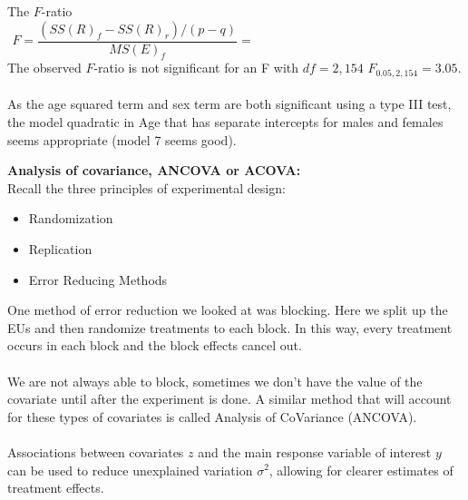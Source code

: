The $F$-ratio 
$$F=\frac{\left(SS(R)_f - SS(R)_r\right)/(p-q)}{MS(E)_f} = ~~~~~~~~~~~~~~~~~~~~~~~~~~~~~~~~~~~~~~~~~~~~~~~~~~~~~~~~~~~~~~~~~~~~~~~~~$$
The observed $F$-ratio is not significant for an F with $df=2,154$ $F_{0.05,2,154}=3.05$.\\~\\

As the age squared term and sex term are both significant using a type III test, the model quadratic in Age that has separate intercepts for males and females seems appropriate (model 7 seems good).

\newpage

\Large\textbf{Analysis of covariance, ANCOVA or ACOVA:}\large\\
Recall the three principles of experimental design:
\begin{itemize}
\item Randomization
\item Replication
\item Error Reducing Methods
\end{itemize}

One method of error reduction we looked at was blocking.  Here we split up the EUs and then randomize treatments to each block.  In this way, every treatment occurs in each block and the block effects cancel out.\\~\\
We are not always able to block, sometimes we don't have the value of the covariate until after the experiment is done.  A similar method that will account for these types of covariates is called Analysis of CoVariance (ANCOVA).\\~\\
Associations between covariates $z$ and the main response variable of interest $y$ can be used to reduce unexplained variation $\sigma^2$, allowing for clearer estimates of treatment effects.\\~\\


